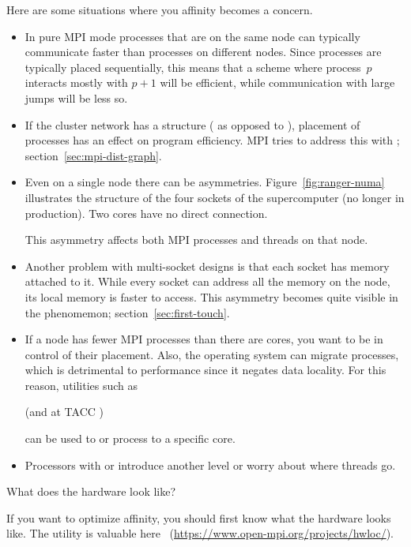Here are some situations where you affinity becomes a concern.
\begin{itemize}
\item In pure MPI mode processes that are on the same node can
  typically communicate faster than processes on different
  nodes. Since processes are typically placed sequentially, this means
  that a scheme where process~$p$ interacts mostly with $p+1$ will be
  efficient, while communication with large jumps will be less so.
\item If the cluster network has a structure
  ( as opposed to ),
  placement of processes has an effect on program efficiency.  MPI
  tries to address this with ;
  section~\ref{sec:mpi-dist-graph}.
\item Even on a single node there can be
  asymmetries. Figure~\ref{fig:ranger-numa} illustrates the structure
  of the four sockets of the  supercomputer (no
  longer in production). Two cores have no direct connection.

  This asymmetry affects both MPI processes and threads on that node.
\item Another problem with multi-socket designs is that each socket
  has memory attached to it. While every socket can address all the
  memory on the node, its local memory is faster to access. This
  asymmetry becomes quite visible in the 
  phenomemon; section~\ref{sec:first-touch}.
\item If a node has fewer MPI processes than there are cores, you want
  to be in control of their placement. Also, the operating system can
  migrate processes, which is detrimental to performance since it
  negates data locality. For this reason, utilities such as
\begin{tacc}
(and at TACC )    
\end{tacc}
  can be used to  or process to a specific core.
\item Processors with  or
   introduce another level or worry
  about where threads go.
\end{itemize}

 {What does the hardware look like?}

If you want to optimize affinity, you should first know what the
hardware looks like. The  utility is valuable
here~\cite{goglin:hwloc} (\url{https://www.open-mpi.org/projects/hwloc/}).

